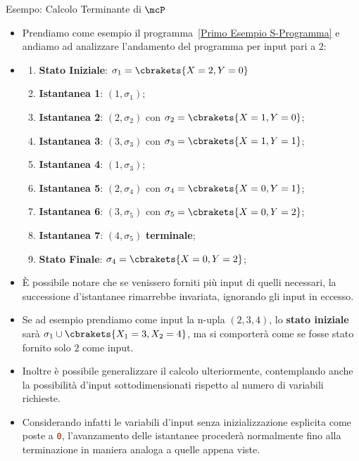 \newpage
\begin{generalbox}[colframe=azure-gradient-3!90!black]{Esempo: Calcolo Terminante di \(\mcP\)}
\begin{itemize}
  \item [] Prendiamo come esempio il programma~\ref{Primo Esempio S-Programma} e andiamo ad analizzare l'andamento del programma per input pari a \textbf{\(2\)}:
  \item [] \begin{enumerate}[start=0]
    \item \textbf{Stato Iniziale}: \(\sigma_1 = \cbrakets{X=2,Y=0}\)
    \item \textbf{Istantanea 1}: \((1,\sigma_1)\);
    \item \textbf{Istantanea 2}: \((2,\sigma_2)\) con \(\sigma_2 = \cbrakets{X=1,Y=0}\);
    \item \textbf{Istantanea 3}: \((3,\sigma_3)\) con \(\sigma_3 = \cbrakets{X=1,Y=1}\);
    \item \textbf{Istantanea 4}: \((1,\sigma_3)\);
    \item \textbf{Istantanea 5}: \((2,\sigma_4)\) con \(\sigma_4 = \cbrakets{X=0,Y=1}\);
    \item \textbf{Istantanea 6}: \((3,\sigma_5)\) con \(\sigma_5 = \cbrakets{X=0,Y=2}\);
    \item \textbf{Istantanea 7}: \((4,\sigma_5)\) \textbf{terminale};
    \item \textbf{Stato Finale}: \(\sigma_4 = \cbrakets{X=0,Y=2}\);
  \end{enumerate}
  \item [] È possibile notare che se venissero forniti più input di quelli necessari, la successione d'istantanee rimarrebbe invariata, ignorando gli input in eccesso.
  \item [] Se ad esempio prendiamo come input la n-upla \((2,3,4)\), lo \textbf{stato iniziale} sarà \(\sigma_1 \cup \cbrakets{X_1=3,X_2=4}\), ma si comporterà come se fosse stato fornito solo \(2\) come input.
  \item [] Inoltre è possibile generalizzare il calcolo ulteriormente, contemplando anche la possibilità d'input sottodimensionati rispetto al numero di variabili richieste.
  \item [] Considerando infatti le variabili d'input senza inizializzazione esplicita come poste a \lstinline[language=ini]{0}, l'avanzamento delle istantanee procederà normalmente fino alla terminazione in maniera analoga a quelle appena viste.
\end{itemize}

\end{generalbox}

